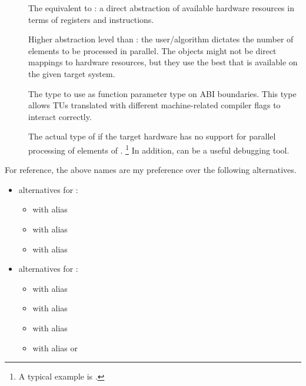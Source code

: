 \begin{description}
  \item[\simdabi{}] The equivalent to : a direct abstraction of available hardware resources in terms of registers and instructions.

  \item[\simdabi{}] Higher abstraction level than : the user/algorithm dictates the number of elements to be processed in parallel.
    The objects might not be direct mappings to hardware resources, but they use the best that is available on the given target system.

  \item[\simdabi{}] The type to use as function parameter type on ABI boundaries.
    This type allows TUs translated with different machine-related compiler flags to interact correctly.

  \item[\simdabi{}] The actual type of  if the target hardware has no support for parallel processing of elements of .%
    \footnote{A typical example is \simdabi{}.}
    In addition,  can be a useful debugging tool.
\end{description}

For reference, the above names are my preference over the following alternatives.
\begin{itemize}
  \item alternatives for :
    \begin{itemize}
      \item {} with  alias 
      \item {} with  alias 
      \item {} with  alias 
    \end{itemize}

  \item alternatives for :
    \begin{itemize}
      \item {} with  alias 
      \item {} with  alias 
      \item {} with  alias 
      \item {} with  alias  or 
    \end{itemize}
\end{itemize}

